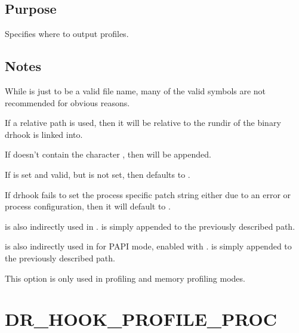 \documentclass[letterpaper,10pt,english]{sphinxmanual}
\begin{document}
\subsection{Purpose}
\label{\detokenize{flag/flag:id67}}
\sphinxAtStartPar
Specifies where to output profiles.


\subsection{Notes}
\label{\detokenize{flag/flag:id68}}
\sphinxAtStartPar
While  is just to be a valid file name, many of the valid symbols are not recommended for obvious reasons.

\sphinxAtStartPar
If a relative path is used, then it will be relative to the rundir of the binary drhook is linked into.

\sphinxAtStartPar
If  doesn’t contain the character \sphinxcode{\sphinxupquote{\%}}, then  will be appended.

\sphinxAtStartPar
If {\hyperref[\detokenize{flag/flag:dr-hook-profile-proc}]{}} is set and valid, but  is not set, then  defaults to .

\sphinxAtStartPar
If drhook fails to set the process specific patch string either due to an error or process configuration, then it will default to .

\sphinxAtStartPar
{} is also indirectly used in .  is simply appended to the previously described path.

\sphinxAtStartPar
{} is also indirectly used in  for PAPI mode, enabled with {\hyperref[\detokenize{flag/flag:dr-hook-opt}]{}}.  is simply appended to the previously described path.

\sphinxAtStartPar
This option is only used in profiling and memory profiling modes.


\section{DR\_HOOK\_PROFILE\_PROC}
\label{\detokenize{flag/flag:dr-hook-profile-proc}}\label{\detokenize{flag/flag:id70}}
\end{document}
